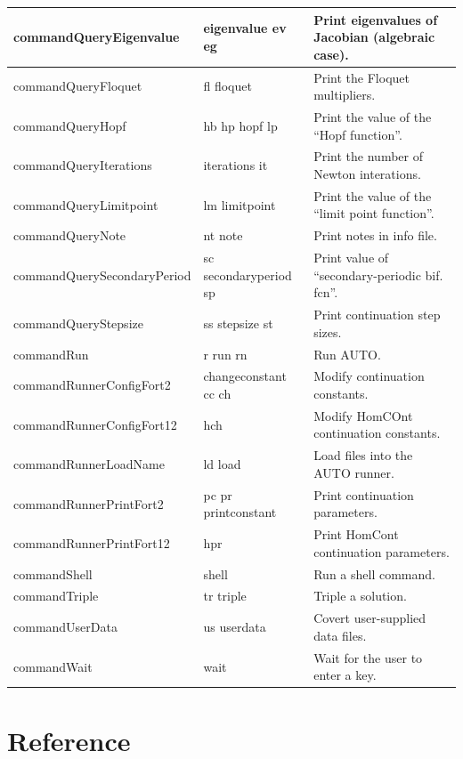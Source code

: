 \documentclass[12pt]{report}
\begin{document}
\begin{longtable}{|l|p{1.5in}|p{2in}|}
commandQueryEigenvalue & eigenvalue ev eg  & Print eigenvalues of Jacobian (algebraic case).\\ \hline 
commandQueryFloquet & fl floquet  & Print the Floquet multipliers.\\ \hline 
commandQueryHopf & hb hp hopf lp  & Print the value of the ``Hopf function''.\\ \hline 
commandQueryIterations & iterations it  & Print the number of Newton interations.\\ \hline 
commandQueryLimitpoint & lm limitpoint  & Print the value of the ``limit point function''.\\ \hline 
commandQueryNote & nt note  & Print notes in info file.\\ \hline 
commandQuerySecondaryPeriod & sc secondaryperiod sp  & Print value of ``secondary-periodic bif. fcn''.\\ \hline 
commandQueryStepsize & ss stepsize st  & Print continuation step sizes.\\ \hline 
commandRun & r run rn  & Run AUTO.\\ \hline 
commandRunnerConfigFort2 & changeconstant cc ch  & Modify continuation constants.\\ \hline 
commandRunnerConfigFort12 & hch  & Modify HomCOnt continuation constants.\\ \hline 
commandRunnerLoadName & ld load  & Load files into the AUTO runner.\\ \hline 
commandRunnerPrintFort2 & pc pr printconstant  & Print continuation parameters.\\ \hline 
commandRunnerPrintFort12 & hpr & Print HomCont continuation parameters.\\ \hline 
commandShell & shell  & Run a shell command.\\ \hline 
commandTriple & tr triple  & Triple a solution.\\ \hline 
commandUserData & us userdata  & Covert user-supplied data files.\\ \hline 
commandWait & wait  & Wait for the user to enter a key.\\ \hline 
\end{longtable}

\pagebreak
\section{ Reference }  \label{sec:clui reference}
\end{document}
